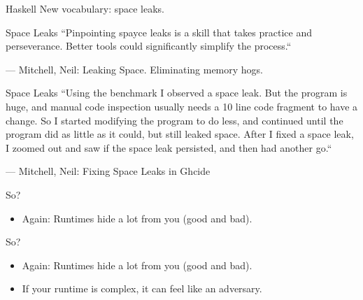 \documentclass[aspectratio=169,14pt]{beamer}
\begin{document}
  \begin{frame}{Haskell}
    New vocabulary: space leaks.
  \end{frame}
  \begin{frame}{Space Leaks}
    ``Pinpointing spayce leaks is a skill that takes practice and perseverance. Better
    tools could significantly simplify the process.``

    --- Mitchell, Neil: Leaking Space. Eliminating memory hogs.
  \end{frame}
  \begin{frame}{Space Leaks}
    ``Using the benchmark I observed a space leak. But the program is huge, and
    manual code inspection usually needs a 10 line code fragment to have a change.
    So I started modifying the program to do less, and continued until the program
    did as little as it could, but still leaked space. After I fixed a space leak,
    I zoomed out and saw if the space leak persisted, and then had another go.``

    --- Mitchell, Neil: Fixing Space Leaks in Ghcide
  \end{frame}
  \begin{frame}{So?}
    \begin{itemize}
      \item Again: Runtimes hide a lot from you (good and bad).
    \end{itemize}
  \end{frame}
  \begin{frame}{So?}
    \begin{itemize}
      \item Again: Runtimes hide a lot from you (good and bad).
      \item If your runtime is complex, it can feel like an adversary.
    \end{itemize}
  \end{frame}
\end{document}
